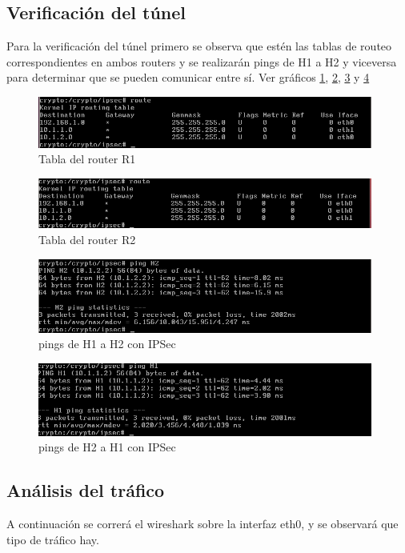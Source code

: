\documentclass[a4paper,10pt]{article}
\begin{document}
		\subsection{Verificaci\'on del t\'unel}	
			Para la verificación del túnel primero se observa que estén las tablas de routeo correspondientes en ambos routers y se realizarán pings de H1 a H2 y viceversa para determinar que se pueden comunicar entre sí. Ver gráficos \ref{img021}, \ref{img022}, \ref{img023} y \ref{img024}
			
	\begin{figure}[H]
		\centering
		\includegraphics[width=11cm]{Imagenes/tablaRouteoR1.png}
		\caption{Tabla del router R1}\label{img021}
	\end{figure}	
	\begin{figure}[H]
		\centering
		\includegraphics[width=11cm]{Imagenes/tablaRouteoR2.png}
		\caption{Tabla del router R2}\label{img022}
	\end{figure}	
	\begin{figure}[H]
		\centering
		\includegraphics[width=11cm]{Imagenes/pingH1H2ConIPsec.png}
		\caption{pings de H1 a H2 con IPSec}\label{img023}
	\end{figure}	
	\begin{figure}[H]
		\centering
		\includegraphics[width=11cm]{Imagenes/pingH2H1ConIPsec.png}
		\caption{pings de H2 a H1 con IPSec}\label{img024}
	\end{figure}	
	
		\subsection{Análisis del tráfico}
	\indent A continuación se correrá el wireshark sobre la interfaz eth0, y se observará que tipo de tráfico hay.
	
\end{document}

